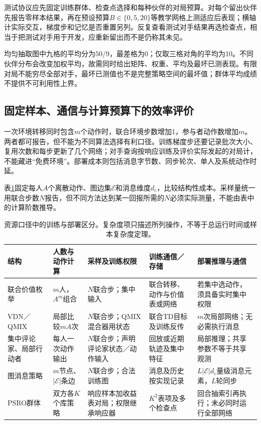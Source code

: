 测试协议应先固定训练群体、检查点选择和每种伙伴的对局预算。对每个留出伙伴先报告零样本结果，再在预设预算$B\in\{0,5,20\}$等教学网格上测适应后表现；横轴计实际交互，梯度步和记忆是否重置另列。反复查看测试对手结果再选检查点，相当于把测试对手用于开发，应重新留出而不是仍称其未见。

均匀抽取图中九格的平均分为$50/9$，最差格为0；仅取三格对角的平均为10。不同伙伴分布会改变加权平均，故需同时给出矩阵、权重、平均及最坏已测表现。有限对局不能穷尽全部对手，最坏已测值也不是完整策略空间的最坏值；群体平均成绩不提供不可利用性上界。

\subsection{固定样本、通信与计算预算下的效率评价}
\label{sec:rl-multi-agent-efficiency}

一次环境转移同时包含$m$个动作时，联合环境步数增加1，参与者动作数增加$m$。两者都可报告，但不能为不同算法选择有利口径。训练梯度步还要记录批次大小、复用次数和每步更新了几个网络；对手查询按响应训练及评价实际发起的对局计，不能藏进“免费环境”。部署成本则包括消息字节数、同步轮次、单人及系统动作时延。

表\ref{tab:rl-multi-agent-resources}固定每人$A$个离散动作、图边集$\mathcal E$和消息维度$d_c$，比较结构性成本。采样量统一用联合步数$N$报告，但不同方法达到某一回报所需的$N$必须实际测量，不能由表中的计算阶数推导。

\begin{table}[htbp]
 \centering
 \begin{tabularx}{\linewidth}{@{}l >{\raggedright\arraybackslash}X >{\raggedright\arraybackslash}X >{\raggedright\arraybackslash}X >{\raggedright\arraybackslash}X@{}}
 \toprule
 结构 & 人数与动作计算 & 采样及训练权限 & 训练通信／存储 & 部署推理与通信\\
 \midrule
 联合价值枚举 & $m$人，$A^m$组合 & $N$联合步；集中输入 & 联合转移、动作与价值表或网络 & 若集中选动作，须具备实时集中权限\\
 VDN／QMIX & 局部比较$mA$次 & $N$联合步；QMIX混合器用状态 & 联合TD目标及训练反传 & $m$次局部网络；无必需执行消息\\
 集中评论家、局部行动者 & 每人一次动作输出 & $N$联合步；声明评论家状态／动作输入 & 回放或近期轨迹及集中特征 & 局部推理；共享参数不等于共享观测\\
 图消息策略 & $m$节点、$|\mathcal E|$条边 & $N$联合步；合法训练图 & 消息及历史按实现记录 & $L|\mathcal E|d_c$量级消息元素，$L$轮同步\\
 PSRO群体 & 双方各$K$个库策略 & 响应样本加收益表对局；权限继承响应器 & $K^2$表项及多个检查点 & 回合抽索引再执行；未必同时运行全部网络\\
 \bottomrule
 \end{tabularx}
 \caption{资源口径中的训练与部署区分。复杂度项只描述所列操作，不等于总运行时间或样本复杂度定理。}
 \label{tab:rl-multi-agent-resources}
\end{table}

